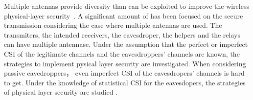 \documentclass[12pt,journal,draftclsnofoot,onecolumn]{IEEEtran}
\begin{document}
Multiple antennas provide diversity than can be exploited to improve the wireless physical-layer
security~\cite{zou_improving_2015}. A significant amount of has been focused on the secure transmission considering the case where multiple antennas are used. The transmiters, the intended receivers, the eavesdroper, the helpers and the relays can have multiple antennase. Under the assumption that the perfect or imperfect CSI of the legitimate channels and the eavesdroppers' channels are known\cite{6584932,wang2013secure,cumanan2014secrecy,jayasinghe2014secure}, the strategies to implement pysical layer security are investigated. When considering passive eavedroppers， even imperfect CSI of the eavesdropers' channels is hard to get. Under the knowledge of statistical CSI for the eavesdopers, the strategies of physical layer security are studied \cite{yang2013transmit,wang2013secure,hui2015secure,tsai2014power,chen2015large,pei_adaptive_2014}. 

\end{document}
